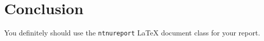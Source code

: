 \section{Conclusion}

You definitely should use the \texttt{ntnureport} \LaTeX{} document class for your report.
